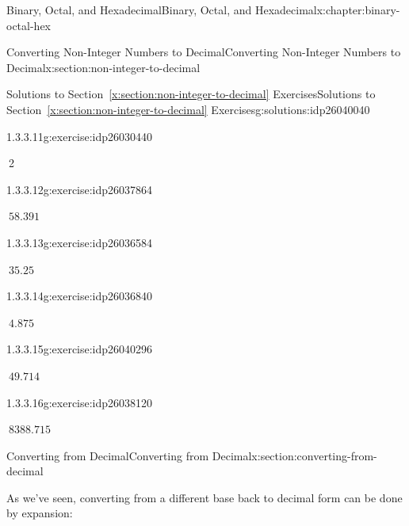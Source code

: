 \documentclass[twoside,10pt,]{book}
\newcommand{\xreffont}{\relax}
\numberwithin{equation}{section}
\begin{document}
\begin{chapterptx}{Binary, Octal, and Hexadecimal}{}{Binary, Octal, and Hexadecimal}{}{}{x:chapter:binary-octal-hex}
\begin{sectionptx}{Converting Non-Integer Numbers to Decimal}{}{Converting Non-Integer Numbers to Decimal}{}{}{x:section:non-integer-to-decimal}
\begin{solutions-subsection}{Solutions to Section~{\xreffont\ref*{x:section:non-integer-to-decimal}} Exercises}{}{Solutions to Section~{\xreffont\ref*{x:section:non-integer-to-decimal}} Exercises}{}{}{g:solutions:idp26040040}
\begin{exercisegroup}
\begin{divisionsolutioneg}{1.3.3.11}{}{g:exercise:idp26030440}%
\par\smallskip%
\noindent\hypertarget{g:solution:idp26024808-main}{}\(\ \)2\end{divisionsolutioneg}%
\end{exercisegroup}
\par\medskip\noindent
\begin{exercisegroup}
\begin{divisionsolutioneg}{1.3.3.12}{}{g:exercise:idp26037864}%
\par\smallskip%
\noindent\hypertarget{g:solution:idp26033896-main}{}\(\ 58.391\)\end{divisionsolutioneg}%
\begin{divisionsolutioneg}{1.3.3.13}{}{g:exercise:idp26036584}%
\par\smallskip%
\noindent\hypertarget{g:solution:idp26039528-main}{}\(\ 35.25\)\end{divisionsolutioneg}%
\begin{divisionsolutioneg}{1.3.3.14}{}{g:exercise:idp26036840}%
\par\smallskip%
\noindent\hypertarget{g:solution:idp26035432-main}{}\(\ 4.875\)\end{divisionsolutioneg}%
\begin{divisionsolutioneg}{1.3.3.15}{}{g:exercise:idp26040296}%
\par\smallskip%
\noindent\hypertarget{g:solution:idp26038888-main}{}\(\ 49.714\)\end{divisionsolutioneg}%
\begin{divisionsolutioneg}{1.3.3.16}{}{g:exercise:idp26038120}%
\par\smallskip%
\noindent\hypertarget{g:solution:idp26038376-main}{}\(\ 8388.715\)\end{divisionsolutioneg}%
\end{exercisegroup}
\par\medskip\noindent
\end{solutions-subsection}
\end{sectionptx}
%
%
\typeout{************************************************}
\typeout{************************************************}
%
\begin{sectionptx}{Converting from Decimal}{}{Converting from Decimal}{}{}{x:section:converting-from-decimal}
\begin{introduction}{}%
As we've seen, converting from a different base back to decimal form can be done by expansion:%

\end{introduction}
\end{sectionptx}
\end{chapterptx}
\end{document}
